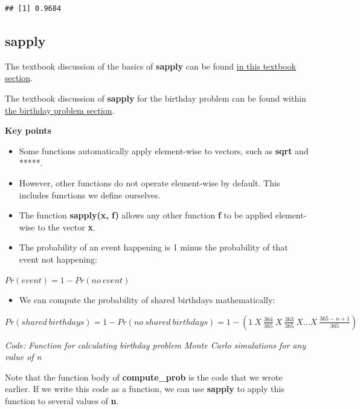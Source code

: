\documentclass[
]{article}
\providecommand{\tightlist}{%
  \setlength{\itemsep}{0pt}\setlength{\parskip}{0pt}}
\begin{document}
\begin{verbatim}
## [1] 0.9684
\end{verbatim}

\hypertarget{sapply}{%
\subsection{sapply}\label{sapply}}

The textbook discussion of the basics of \textbf{sapply} can be found
\href{https://rafalab.github.io/dsbook/programming-basics.html\#vectorization}{in
this textbook section}.

The textbook discussion of \textbf{sapply} for the birthday problem can
be found within
\href{https://rafalab.github.io/dsbook/probability.html\#birthday-problem}{the
birthday problem section}.

\textbf{Key points}

\begin{itemize}
\tightlist
\item
  Some functions automatically apply element-wise to vectors, such as
  \textbf{sqrt} and *****.
\item
  However, other functions do not operate element-wise by default. This
  includes functions we define ourselves.
\item
  The function \textbf{sapply(x, f)} allows any other function
  \textbf{f} to be applied element-wise to the vector \textbf{x}.
\item
  The probability of an event happening is 1 minus the probability of
  that event not happening:
\end{itemize}

\(Pr(event) = 1 - Pr(no\:event)\)

\begin{itemize}
\tightlist
\item
  We can compute the probability of shared birthdays mathematically:
\end{itemize}

\(Pr(shared\:birthdays) = 1 − Pr(no\:shared\:birthdays) = 1 − (1\:X\: \frac{364}{365}\:X \:\frac{363}{365}\:X...X\: \frac{365−n+1}{365})\)

\emph{Code: Function for calculating birthday problem Monte Carlo
simulations for any value of n}

Note that the function body of \textbf{compute\_prob} is the code that
we wrote earlier. If we write this code as a function, we can use
\textbf{sapply} to apply this function to several values of \textbf{n}.
\end{document}
